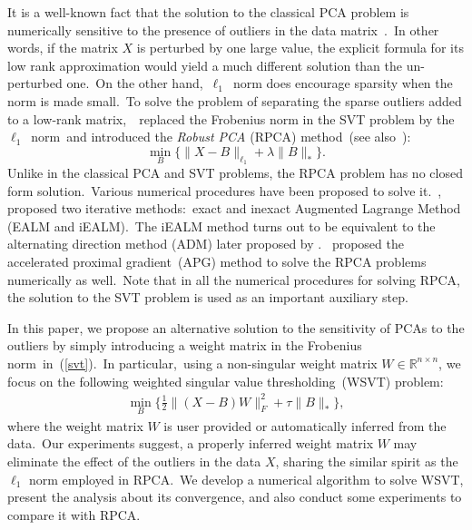 \documentclass[twoside,11pt]{article}
\begin{document}
It is a well-known fact that the solution to the classical PCA problem is numerically sensitive to the presence of outliers in the data matrix~\citep{LinChenMa,APG,candeslimawright}.~In other words, if the matrix $X$ is perturbed by one large value, %
the explicit formula for its low rank approximation would yield a much different solution than the un-perturbed one.~On the other hand,~$\ell_1$~norm does encourage sparsity when the norm is made small.~To solve the problem of separating the sparse outliers added to a low-rank matrix,~\citet{candeslimawright}~replaced the Frobenius norm in the SVT problem by the $\ell_1$~norm~and introduced the {\it Robust PCA} (RPCA) method~(see also~\citet{LinChenMa}):
\begin{equation}\label{rpca}
	\min_B\{\|X-B\|_{\ell_1}+\lambda \|B\|_*\}.
\end{equation}
Unlike in the classical PCA and SVT problems, the RPCA problem has no closed form solution.~Various numerical procedures have been proposed to solve it.~\citet{LinChenMa}, 
proposed two iterative methods:~exact and inexact Augmented Lagrange Method (EALM and iEALM).~The iEALM method turns out to be equivalent to the alternating direction method (ADM) later proposed by \citet{tao-yuan}.~\citet{APG} proposed the accelerated proximal gradient~(APG) method to solve the RPCA problems numerically as well.~Note that in all the numerical procedures for solving RPCA, the solution to the SVT problem is used as an important auxiliary step. 

In this paper, we propose an alternative solution to the sensitivity of PCAs to the outliers by simply introducing a weight matrix in the Frobenius norm~in~(\ref{svt}).~In particular,~using a non-singular weight matrix $W\in \mathbb{R}^{n\times n}$, we focus on the following weighted singular value thresholding~(WSVT) problem:
\begin{eqnarray}\label{weighted svt}
\min_B\{\frac{1}{2}\|(X-B)W\|_F^2+\tau \|B\|_*\},
\end{eqnarray}
where the weight matrix $W$ is user provided or automatically inferred from the data.~Our experiments suggest, a properly inferred weight matrix $W$ may eliminate the effect of the outliers in the data $X$, sharing the similar spirit as the $\ell_1$ norm employed in RPCA.~We develop a numerical algorithm to solve WSVT, present the analysis about its convergence, and also conduct some experiments to compare it with RPCA.
\end{document}
